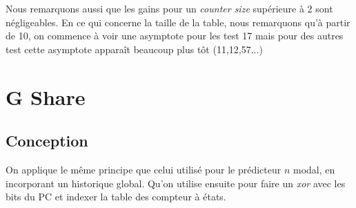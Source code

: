 \documentclass[a4paper]{article}
\begin{document}
Nous remarquons aussi que les gains pour un \textit{counter size} supérieure à 2 sont négligeables. En ce qui concerne la taille de la table, nous remarquons qu'à partir de 10, on commence à voir une asymptote pour les test 17 mais pour des autres test cette asymptote apparaît beaucoup plus tôt (11,12,57...)

\section{G Share}
\subsection{Conception}
On applique le même principe que celui utilisé pour le prédicteur $n$ modal, en incorporant un historique global. Qu'on utilise ensuite pour faire un \textit{xor} avec les bits du PC et indexer la table des compteur à états.
\end{document}
